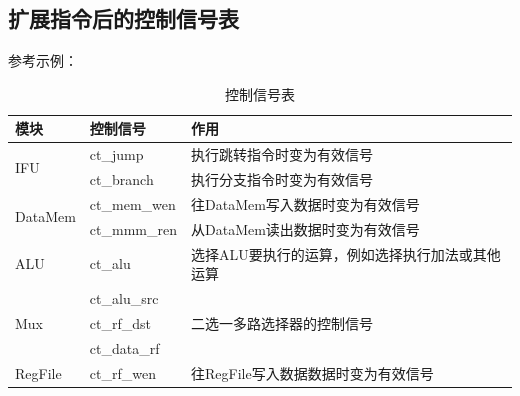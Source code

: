 \documentclass[]{USTBReport}
\begin{document}
    \subsection{扩展指令后的控制信号表}
    参考示例：
    \begin{table}
        \centering
        \caption{控制信号表}
        \begin{tabular}{@{\extracolsep\fill}lll@{\extracolsep\fill}}
            \toprule
            模块                                 & 控制信号         & 作用                                \\
            \midrule
            \multirow{2}[4]{*}{IFU}            & ct\_jump     & 执行跳转指令时变为有效信号                     \\
            \cmidrule{2-3}    \multicolumn{1}{r}{} & ct\_branch   & 执行分支指令时变为有效信号                     \\
            \midrule
            \multirow{2}[4]{*}{DataMem}        & ct\_mem\_wen & 往DataMem写入数据时变为有效信号               \\
            \cmidrule{2-3}    \multicolumn{1}{r}{} & ct\_mmm\_ren & 从DataMem读出数据时变为有效信号               \\
            \midrule
            ALU                                & ct\_alu      & 选择ALU要执行的运算，例如选择执行加法或其他运算         \\
            \midrule
            \multirow{3}[6]{*}{Mux}            & ct\_alu\_src & \multirow{3}[6]{*}{二选一多路选择器的控制信号} \\
            \cmidrule{2-2}    \multicolumn{1}{r}{} & ct\_rf\_dst  & \multicolumn{1}{r}{}              \\
            \cmidrule{2-2}    \multicolumn{1}{r}{} & ct\_data\_rf & \multicolumn{1}{r}{}              \\
            \midrule
            RegFile                            & ct\_rf\_wen  & 往RegFile写入数据数据时变为有效信号             \\
            \bottomrule
        \end{tabular}%
        \label{tab:1}%
    \end{table}%
\end{document}
